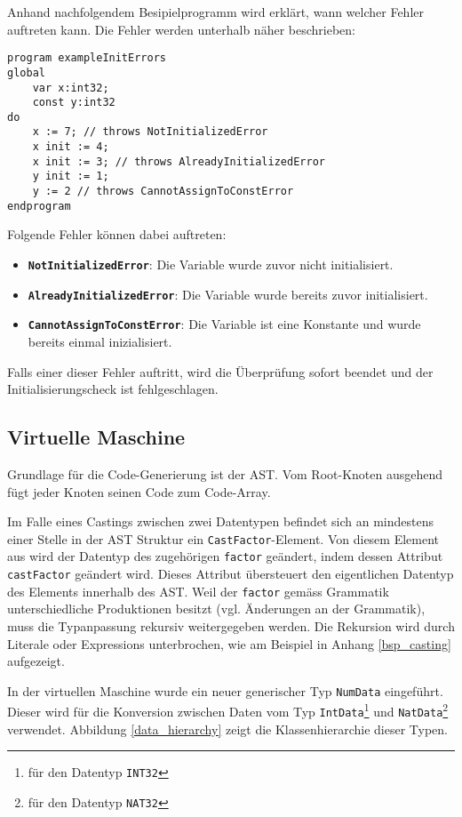 \documentclass[10pt, a4paper, twocolumn]{article} %
\begin{document}
Anhand nachfolgendem Besipielprogramm wird erklärt, wann welcher Fehler auftreten kann.
Die Fehler werden unterhalb näher beschrieben:
\begin{lstlisting}
program exampleInitErrors
global
    var x:int32;
    const y:int32
do
    x := 7; // throws NotInitializedError
    x init := 4;
    x init := 3; // throws AlreadyInitializedError
    y init := 1;
    y := 2 // throws CannotAssignToConstError
endprogram
\end{lstlisting}
Folgende Fehler können dabei auftreten:
\begin{itemize}
    \item \texttt{\textbf{NotInitializedError}}: Die Variable wurde zuvor nicht initialisiert.
    \item \texttt{\textbf{AlreadyInitializedError}}: Die Variable wurde bereits zuvor initialisiert.
    \item \texttt{\textbf{CannotAssignToConstError}}: Die Variable ist eine Konstante und wurde bereits einmal inizialisiert.
\end{itemize}

Falls einer dieser Fehler auftritt, wird die Überprüfung sofort beendet und der Initialisierungscheck ist fehlgeschlagen.

\subsection{Virtuelle Maschine}
Grundlage für die Code-Generierung ist der AST.
Vom Root-Knoten ausgehend fügt jeder Knoten seinen Code zum Code-Array.

Im Falle eines Castings zwischen zwei Datentypen befindet sich an mindestens einer Stelle in der AST Struktur ein \texttt{CastFactor}-Element.
Von diesem Element aus wird der Datentyp des zugehörigen \texttt{factor} geändert, indem dessen Attribut \texttt{castFactor} geändert wird.
Dieses Attribut übersteuert den eigentlichen Datentyp des Elements innerhalb des AST.
Weil der \texttt{factor} gemäss Grammatik unterschiedliche Produktionen besitzt (vgl. Änderungen an der Grammatik), muss die Typanpassung rekursiv weitergegeben werden.
Die Rekursion wird durch Literale oder Expressions unterbrochen, wie am Beispiel in Anhang \ref{bsp_casting} aufgezeigt.

In der virtuellen Maschine wurde ein neuer generischer Typ \texttt{NumData} eingeführt.
Dieser wird für die Konversion zwischen Daten vom Typ \texttt{IntData}\footnote{für den Datentyp \texttt{INT32}} und \texttt{NatData}\footnote{für den Datentyp \texttt{NAT32}} verwendet.
Abbildung \ref{data_hierarchy} zeigt die Klassenhierarchie dieser Typen.
\end{document}
